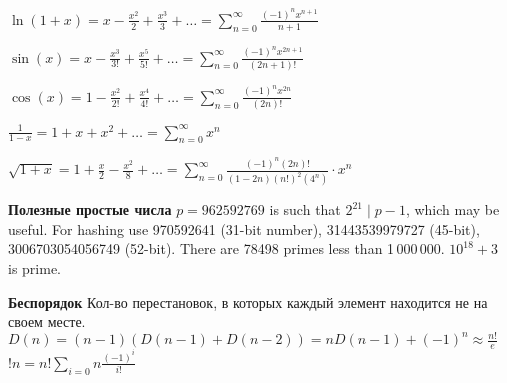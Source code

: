 $\ln(1 + x) = x - \frac{x^2}{2} + \frac{x^3}{3} + \ldots 
= \sum_{n = 0}^{\infty}\frac{(-1)^n x^{n + 1}}{n + 1}$

$\sin(x) = x - \frac{x^3}{3!} + \frac{x^5}{5!} + \ldots
= \sum_{n = 0}^{\infty}\frac{(-1)^n x^{2n + 1}}{(2n + 1)!}$

$\cos(x) = 1 - \frac{x^2}{2!} + \frac{x^4}{4!} + \ldots
= \sum_{n = 0}^{\infty}\frac{(-1)^n x^{2n}}{(2n)!}$

$\frac{1}{1 - x} = 1 + x + x^2 + \ldots 
= \sum_{n = 0}^{\infty}x^n$

$\sqrt{1 + x} = 1 + \frac{x}{2} - \frac{x^2}{8} + \ldots
= \sum_{n = 0}^{\infty}\frac{(-1)^n (2n)!}{(1 - 2n)(n!)^2(4^n)} \cdot x^n$

\textbf{Полезные простые числа}
$p=962592769$ is such that $2^{21} \mid p-1$, which may be useful. For hashing
use 970592641 (31-bit number), 31443539979727 (45-bit), 3006703054056749
(52-bit). There are 78498 primes less than 1\,000\,000.
$10^18 + 3$ is prime.

\textbf{Беспорядок}
Кол-во перестановок, в которых каждый элемент находится не на своем месте.
$D(n) = (n - 1)(D(n - 1) + D(n - 2)) = nD(n - 1) + (-1)^n \approx \frac{n!}{e}$
$!n = n!\sum_{i = 0}{n}\frac{(-1)^i}{i!}$